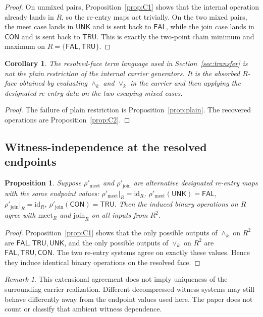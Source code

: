 \documentclass[11pt]{article}
\newtheorem{proposition}{Proposition}
\newtheorem{corollary}{Corollary}
\theoremstyle{remark}
\newtheorem*{remark}{Remark}
\newcommand{\UNK}{\ensuremath{\mathsf{UNK}}}
\newcommand{\FAL}{\ensuremath{\mathsf{FAL}}}
\newcommand{\TRU}{\ensuremath{\mathsf{TRU}}}
\newcommand{\CON}{\ensuremath{\mathsf{CON}}}
\newcommand{\meetk}{\ensuremath{\wedge_k}}
\newcommand{\joink}{\ensuremath{\vee_k}}
\newcommand{\meetR}{\ensuremath{\mathrm{meet}_R}}
\newcommand{\joinR}{\ensuremath{\mathrm{join}_R}}
\begin{document}
\begin{proof}
On unmixed pairs, Proposition~\ref{prop:C1} shows that the internal
operation already lands in $R$, so the re-entry maps act trivially. On the
two mixed pairs, the meet case lands in $\UNK$ and is sent back to $\FAL$,
while the join case lands in $\CON$ and is sent back to $\TRU$. This is
exactly the two-point chain minimum and maximum on $R=\{\FAL,\TRU\}$.
\end{proof}

\begin{corollary}
The resolved-face term language used in Section~\ref{sec:transfer} is not
the plain restriction of the internal carrier generators. It is the
absorbed $R$-face obtained by evaluating $\meetk$ and $\joink$ in the
carrier and then applying the designated re-entry data on the two escaping
mixed cases.
\end{corollary}

\begin{proof}
The failure of plain restriction is Proposition~\ref{prop:plain}. The
recovered operations are Proposition~\ref{prop:C2}.
\end{proof}

\subsection{Witness-independence at the resolved endpoints}

\begin{proposition}\label{prop:C4}
Suppose $\rho'_{\mathrm{meet}}$ and $\rho'_{\mathrm{join}}$ are alternative
designated re-entry maps with the same endpoint values:
$\rho'_{\mathrm{meet}}|_R=\mathrm{id}_R$,
$\rho'_{\mathrm{meet}}(\UNK)=\FAL$,
$\rho'_{\mathrm{join}}|_R=\mathrm{id}_R$,
$\rho'_{\mathrm{join}}(\CON)=\TRU$. Then the induced binary operations on
$R$ agree with $\meetR$ and $\joinR$ on all inputs from $R^2$.
\end{proposition}

\begin{proof}
Proposition~\ref{prop:C1} shows that the only possible outputs of $\meetk$
on $R^2$ are $\FAL,\TRU,\UNK$, and the only possible outputs of $\joink$ on
$R^2$ are $\FAL,\TRU,\CON$. The two re-entry systems agree on exactly these
values. Hence they induce identical binary operations on the resolved face.
\end{proof}

\begin{remark}
This extensional agreement does not imply uniqueness of the surrounding
carrier realization. Different decompressed witness systems may still
behave differently away from the endpoint values used here. The paper does
not count or classify that ambient witness dependence.
\end{remark}
\end{document}
